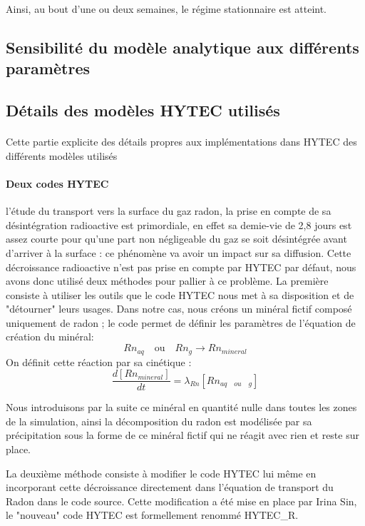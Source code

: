 \documentclass{article}
\begin{document}
Ainsi, au bout d'une ou deux semaines, le régime stationnaire est atteint.

\subsection{Sensibilité du modèle analytique aux différents paramètres}
\label{annexe:sens_analytique}



\subsection{Détails des modèles HYTEC utilisés}
\label{annexe:detail_modele_radon_sub_sec}
\paragraph{}Cette partie explicite des détails propres aux implémentations dans HYTEC des différents modèles utilisés

\paragraph{Deux codes HYTEC}
l'étude du transport vers la surface du gaz radon, la prise en compte de sa désintégration radioactive est primordiale, en effet sa demie-vie de 2,8 jours est assez courte pour qu'une part non négligeable du gaz se soit désintégrée  avant d'arriver à la surface : ce phénomène va avoir un impact sur sa diffusion. Cette décroissance radioactive n'est pas prise en compte par HYTEC par défaut, nous avons donc utilisé deux méthodes pour pallier à ce problème.
La première consiste à utiliser les outils que le code HYTEC nous met à sa disposition et de "détourner" leurs usages. Dans notre cas, nous créons un minéral fictif composé uniquement de radon ; le code permet de définir les paramètres de l'équation de création du minéral: 
$$Rn_{aq} \quad \text{ou} \quad Rn_{g} \rightarrow Rn_{mineral}$$
On définit cette réaction par sa cinétique : 
$$ \frac{d\left[ Rn_{mineral} \right]}{dt}=\lambda_{Rn} \left[ Rn_{aq \quad ou \quad g} \right] $$

Nous introduisons par la suite ce minéral en quantité nulle dans toutes les zones de la simulation, ainsi la décomposition du radon est modélisée par sa précipitation sous la forme de ce minéral fictif qui ne réagit avec rien et reste sur place.

La deuxième méthode consiste à modifier le code HYTEC lui même en incorporant cette décroissance directement dans l'équation de transport du Radon dans le code source. Cette modification a été mise en place par Irina Sin, le "nouveau" code HYTEC est formellement renommé HYTEC\_R.
\end{document}
